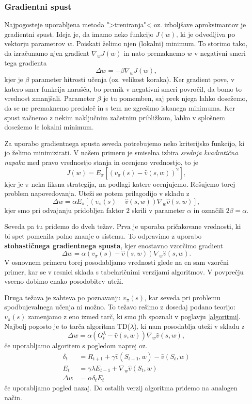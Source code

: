 \documentclass[12pt,a4paper]{amsart}
\theoremstyle{definition} %
\theoremstyle{plain} %
\begin{document}
\subsubsection{Gradientni spust}
Najpogosteje uporabljena metoda ">treniranja"<  oz. izboljšave aproksimantov je gradientni spust. 
Ideja je, da imamo neko funkcijo $J(w)$, ki je odvedljiva po vektorju parametrov $w$. Poiskati želimo njen 
(lokalni) minimum. To storimo tako, da izračunamo njen gradient $\nabla_wJ(w)$ in nato premaknemo $w$
v negativni smeri tega gradienta
$$
\Delta w = - \beta \nabla_wJ(w),
$$
kjer je $\beta$ parameter hitrosti učenja (oz. velikost koraka). Ker gradient pove, v katero smer 
funkcija narašča, bo premik v negativni smeri povročil, da bomo to vrednost zmanjšali. Parameter 
$\beta$ je tu pomemben, saj prek njega lahko dosežemo, da se ne premaknemo predaleč in s tem ne zgrešimo
iskanega minimuma. Ker spust začnemo z nekim naključnim začetnim približkom, lahko v splošnem 
dosežemo le lokalni minimum.

Za uporabo gradientnega spusta seveda potrebujemo neko kriterijsko funkcijo, ki jo želimo minimizirati. 
V našem primeru je smiselna izbira \textit{srednja kvadratična napaka} med pravo vrednostjo stanja in 
ocenjeno vrednostjo, to je 
$$
J(w) = E_\pi [(v_\pi(s) - \hat{v}(s, w))^2],
$$
kjer je $\pi$ neka fiksna strategija, na podlagi katere ocenjujemo. Rešujemo torej problem napovedovanja.
Uteži se potem prilagodijo v skladu z 
$$
\Delta w = \alpha E_\pi [(v_\pi(s) - \hat{v}(s, w)) \nabla_w \hat{v}(s, w)], 
$$
kjer smo pri odvajanju pridobljen faktor $2$ skrili v parameter $\alpha$ in označili $2\beta = \alpha$.

Seveda pa tu pridemo do dveh težav. Prva je uporaba pričakovane vrednosti, ki bi spet pomenila polno 
znanje o sistemu. To odpravimo z uporabo \textbf{stohastičnega gradientnega spusta}, kjer 
enostavno vzorčimo gradient 
$$
\Delta w = \alpha (v_\pi(s) - \hat{v}(s, w)) \nabla_w \hat{v}(s, w). 
$$
V osnovnem primeru torej posodabljamo vrednosti glede na en sam vzorčni primer, kar se v resnici sklada 
s tabelaričnimi verzijami algoritmov.
V povprečju vseeno dobimo enako posodobitev uteži. 

Druga težava je zahteva po poznavanju $v_\pi(s)$, kar seveda pri problemu spodbujevalnega učenja ni 
možno. To težavo rešimo z dosedaj podano teorijo: $v_\pi(s)$ zamenjamo z eno izmed tarč, ki smo jih 
spoznali v poglavju \ref{algoritmi}. Najbolj pogosto je to tarča algoritma TD($\lambda$), ki nam 
posodablja uteži v skladu z 
$$
\Delta w = \alpha (G_t^\lambda - \hat{v}(s, w)) \nabla_w \hat{v}(s, w), 
$$
če uporabljamo algoritem s pogledom naprej oz. 
\begin{align*}
    \delta_t &= R_{t+1} + \gamma \hat{v}(S_{t+1}, w) - \hat{v}(S_t, w) \\
    E_t &= \gamma \lambda E_{t-1} + \nabla_w \hat{v}(S_t, w) \\
    \Delta w &= \alpha \delta_t E_t
\end{align*}
če uporabljamo pogled nazaj. Do ostalih verzij algoritma pridemo na analogen način.
\end{document}
